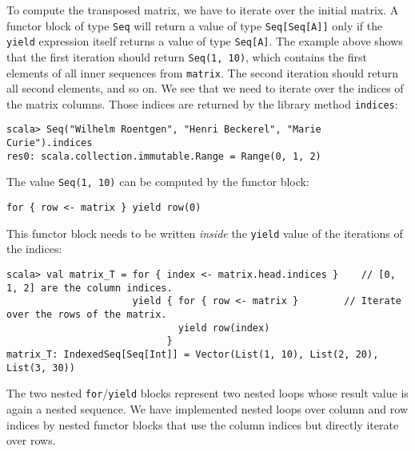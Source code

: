 \noindent To compute the transposed matrix, we have to iterate over
the initial matrix. A functor block of type \lstinline!Seq! will
return a value of type \lstinline!Seq[Seq[A]]! only if the \lstinline!yield!
expression itself returns a value of type \lstinline!Seq[A]!. The
example above shows that the first iteration should return \lstinline!Seq(1, 10)!,
which contains the first elements of all inner sequences from \lstinline!matrix!.
The second iteration should return all second elements, and so on.
We see that we need to iterate over the indices of the matrix columns.
Those indices are returned by the library method \lstinline!indices!:
\begin{lstlisting}
scala> Seq("Wilhelm Roentgen", "Henri Beckerel", "Marie Curie").indices
res0: scala.collection.immutable.Range = Range(0, 1, 2)
\end{lstlisting}
The value \lstinline!Seq(1, 10)! can be computed by the functor block:
\begin{lstlisting}
for { row <- matrix } yield row(0)
\end{lstlisting}
This functor block needs to be written \emph{inside} the \lstinline!yield!
value of the iterations of the indices:
\begin{lstlisting}
scala> val matrix_T = for { index <- matrix.head.indices }    // [0, 1, 2] are the column indices.
                      yield { for { row <- matrix }        // Iterate over the rows of the matrix.
                              yield row(index)
                            }
matrix_T: IndexedSeq[Seq[Int]] = Vector(List(1, 10), List(2, 20), List(3, 30))
\end{lstlisting}

The two nested \lstinline!for!/\lstinline!yield! blocks represent
two nested loops whose result value is again a nested sequence. We
have implemented nested loops over column and row indices by nested
functor blocks that use the column indices but directly iterate over
rows.

